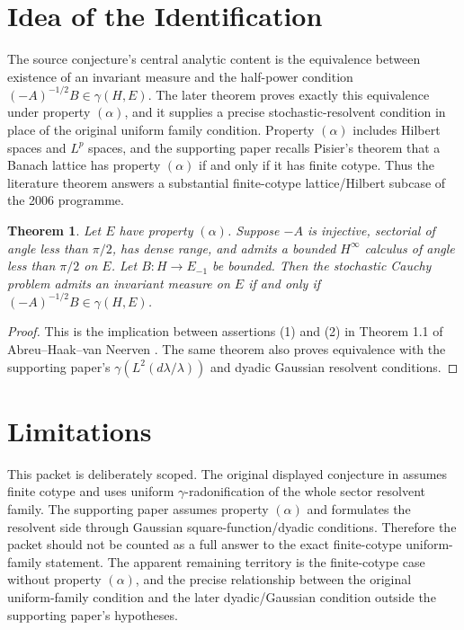 \documentclass[11pt]{article}
\newtheorem{theorem}{Theorem}
\newcommand{\ga}{\gamma}
\begin{document}
\section*{Idea of the Identification}

The source conjecture's central analytic content is the equivalence between
existence of an invariant measure and the half-power condition
$(-A)^{-1/2}B\in\ga(H,E)$. The later theorem proves exactly this equivalence
under property $(\alpha)$, and it supplies a precise stochastic-resolvent
condition in place of the original uniform family condition. Property
$(\alpha)$ includes Hilbert spaces and $L^p$ spaces, and the supporting paper
recalls Pisier's theorem that a Banach lattice has property $(\alpha)$ if and
only if it has finite cotype. Thus the literature theorem answers a substantial
finite-cotype lattice/Hilbert subcase of the 2006 programme.

\begin{theorem}
Let $E$ have property $(\alpha)$. Suppose $-A$ is injective, sectorial of angle
less than $\pi/2$, has dense range, and admits a bounded $H^\infty$ calculus
of angle less than $\pi/2$ on $E$. Let $B:H\to E_{-1}$ be bounded. Then the
stochastic Cauchy problem admits an invariant measure on $E$ if and only if
$(-A)^{-1/2}B\in\ga(H,E)$.
\end{theorem}

\begin{proof}
This is the implication between assertions (1) and (2) in
Theorem 1.1 of Abreu--Haak--van Neerven \cite{AbreuHaakNeerven2012}. The same
theorem also proves equivalence with the supporting paper's
$\ga(L^2(d\lambda/\lambda))$ and dyadic Gaussian resolvent conditions.
\end{proof}

\section*{Limitations}

This packet is deliberately scoped. The original displayed conjecture in
\cite{HaakNeerven2006} assumes finite cotype and uses uniform
$\ga$-radonification of the whole sector resolvent family. The supporting
paper assumes property $(\alpha)$ and formulates the resolvent side through
Gaussian square-function/dyadic conditions. Therefore the packet should not be
counted as a full answer to the exact finite-cotype uniform-family statement.
The apparent remaining territory is the finite-cotype case without property
$(\alpha)$, and the precise relationship between the original uniform-family
condition and the later dyadic/Gaussian condition outside the supporting
paper's hypotheses.
\end{document}

